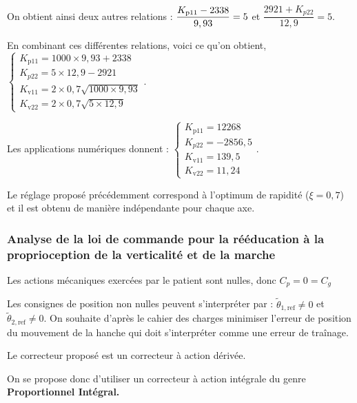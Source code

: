 \begin{corrige}
On obtient ainsi deux autres relations : 
$\dfrac{K_{\text{p11}}-2338}{9,93}=5\time 200$ et 
$\dfrac{2921+K_{p22}}{12,9}=5$.

En combinant ces différentes relations, voici ce qu'on obtient,
$\left\{
\begin{array}{l}
K_{\text{p11}}=1000\times 9,93+2338\\
K_{p22}=5\times 12,9-2921\\
K_{\text{v11}}=2\times 0,7\sqrt{1000\times 9,93}\\
K_{\text{v22}}=2\times 0,7\sqrt{5\times 12,9}
\end{array}
\right.
$.

Les applications numériques donnent : 
$
\left\{
\begin{array}{l}
K_{\text{p11}}=12268 \\
K_{p22}=-2856,5 \\
K_{\text{v11}}=139,5\\
K_{\text{v22}}=11,24
\end{array}
\right.
$.


\end{corrige}\else\fi


\ifprof\begin{corrige}
Le réglage proposé précédemment correspond à l'optimum de rapidité ($\xi=0,7$) et il est obtenu de manière indépendante pour chaque axe.

\end{corrige}\else\fi

\subsubsection{ Analyse de la loi de commande pour la rééducation à la proprioception de la verticalité
et de la marche}


\ifprof\begin{corrige}

Les actions mécaniques exercées par le patient sont nulles, donc $C_p=0=C_g$

Les consignes de position non nulles peuvent s'interpréter par : $\tilde{\theta}_{1,\text{ref}}\neq 0$ et $\tilde{\theta}_{2,\text{ref}}\neq 0$.
On souhaite d'après le cahier des charges minimiser l'erreur de position du mouvement de la hanche qui doit s'interpréter comme une erreur de traînage.

Le correcteur proposé est un correcteur à action dérivée.

On se propose donc d'utiliser un correcteur à action intégrale du genre \textbf{Proportionnel Intégral.}

\end{corrige}\else\fi

